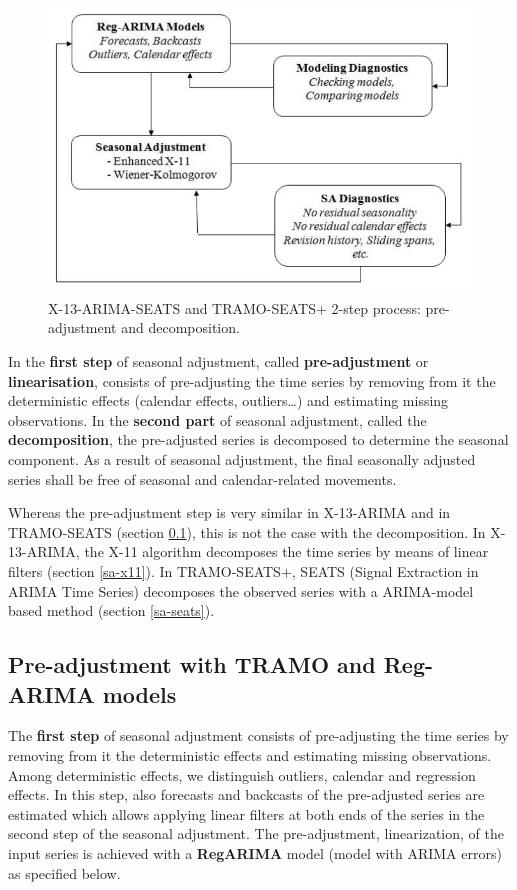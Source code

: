 \documentclass[article]{jss}
\begin{document}
\begin{figure}[htb]
\centering
\includegraphics[scale=0.8]{img/sa_2_steps.PNG} 
\caption{X-13-ARIMA-SEATS and TRAMO-SEATS+ 2-step process: pre-adjustment and decomposition.}
\label{fig:2_step_proc}
\end{figure}

In the \textbf{first step} of seasonal adjustment, called
\textbf{pre-adjustment} or \textbf{linearisation}, consists of
pre-adjusting the time series by removing from it the deterministic
effects (calendar effects, outliers\ldots{}) and estimating missing
observations. In the \textbf{second part} of seasonal adjustment, called
the \textbf{decomposition}, the pre-adjusted series is decomposed to
determine the seasonal component. As a result of seasonal adjustment,
the final seasonally adjusted series shall be free of seasonal and
calendar-related movements.

Whereas the pre-adjustment step is very similar in X-13-ARIMA and in
TRAMO-SEATS (section \ref{pre-adjustment}), this is not the case with
the decomposition. In X-13-ARIMA, the X-11 algorithm decomposes the time
series by means of linear filters (section \ref{sa-x11}). In
TRAMO-SEATS+, SEATS (Signal Extraction in ARIMA Time Series) decomposes
the observed series with a ARIMA-model based method (section
\ref{sa-seats}).

\hypertarget{pre-adjustment}{%
\subsection{Pre-adjustment with TRAMO and Reg-ARIMA
models}\label{pre-adjustment}}

The \textbf{first step} of seasonal adjustment consists of pre-adjusting
the time series by removing from it the deterministic effects and
estimating missing observations. Among deterministic effects, we
distinguish outliers, calendar and regression effects. In this step,
also forecasts and backcasts of the pre-adjusted series are estimated
which allows applying linear filters at both ends of the series in the
second step of the seasonal adjustment. The pre-adjustment,
linearization, of the input series is achieved with a \textbf{RegARIMA}
model (model with ARIMA errors) as specified below.
\end{document}
